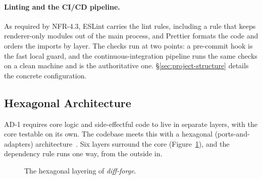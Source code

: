 \paragraph{Linting and the CI/CD pipeline.}
As required by NFR-4.3, ESLint carries the lint rules, including a rule that keeps renderer-only modules out of the main process, and Prettier formats the code and orders the imports by layer. The checks run at two points: a pre-commit hook is the fast local guard, and the continuous-integration pipeline runs the same checks on a clean machine and is the authoritative one. \S\ref{sec:project-structure} details the concrete configuration.

\subsection{Hexagonal Architecture}
\label{sec:hex-arch}
AD-1 requires core logic and side-effectful code to live in separate layers, with the core testable on its own. The codebase meets this with a hexagonal (ports-and-adapters) architecture~\cite{cockburn2005hexagonal}. Six layers surround the core (Figure~\ref{fig:layers}), and the dependency rule runs one way, from the outside in.

\begin{figure}[H]
    \centering
    \resizebox{0.92\textwidth}{!}{
        
    }
    \caption[The hexagonal layering of \textit{diff-forge}.]{The hexagonal layering of \textit{diff-forge}.}
    \label{fig:layers}
\end{figure}

